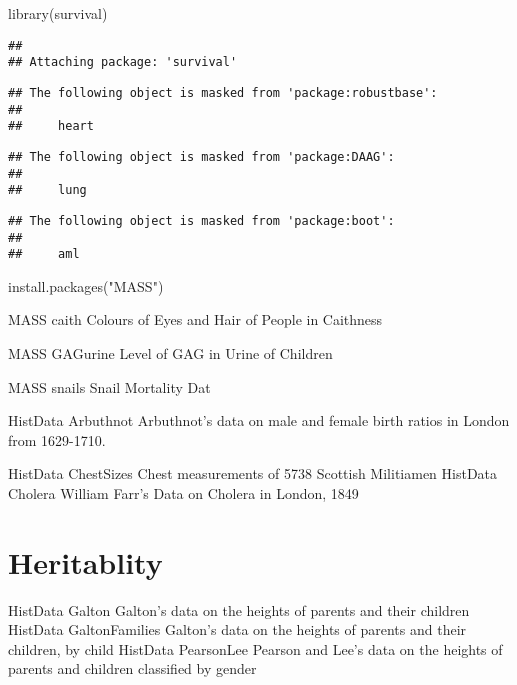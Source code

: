 \documentclass[
]{book}
\newenvironment{Shaded}{\begin{snugshade}}{\end{snugshade}}
\newcommand{\FunctionTok}[1]{\textcolor[rgb]{0.00,0.00,0.00}{#1}}
\newcommand{\NormalTok}[1]{#1}
\newcommand{\StringTok}[1]{\textcolor[rgb]{0.31,0.60,0.02}{#1}}
\begin{document}
\begin{Shaded}
\begin{Highlighting}[]
\FunctionTok{library}\NormalTok{(survival)}
\end{Highlighting}
\end{Shaded}

\begin{verbatim}
## 
## Attaching package: 'survival'
\end{verbatim}

\begin{verbatim}
## The following object is masked from 'package:robustbase':
## 
##     heart
\end{verbatim}

\begin{verbatim}
## The following object is masked from 'package:DAAG':
## 
##     lung
\end{verbatim}

\begin{verbatim}
## The following object is masked from 'package:boot':
## 
##     aml
\end{verbatim}

\begin{Shaded}
\begin{Highlighting}[]
\FunctionTok{install.packages}\NormalTok{(}\StringTok{"MASS"}\NormalTok{)}
\end{Highlighting}
\end{Shaded}

MASS caith Colours of Eyes and Hair of People in Caithness

MASS GAGurine Level of GAG in Urine of Children

MASS snails Snail Mortality Dat

HistData Arbuthnot Arbuthnot's data on male and female birth ratios in London from 1629-1710.

HistData ChestSizes Chest measurements of 5738 Scottish Militiamen
HistData Cholera William Farr's Data on Cholera in London, 1849

\hypertarget{heritablity}{%
\section{Heritablity}\label{heritablity}}

HistData Galton Galton's data on the heights of parents and their children
HistData GaltonFamilies Galton's data on the heights of parents and their children, by child
HistData PearsonLee Pearson and Lee's data on the heights of parents and children classified by gender
\end{document}
